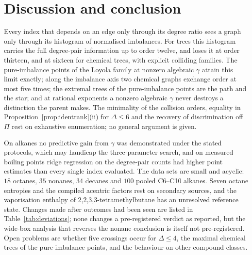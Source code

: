 \section{Discussion and conclusion}\label{sec:conclusion}

Every index that depends on an edge only through its degree ratio sees a
graph only through its histogram of normalised imbalances. For trees this
histogram carries the full degree-pair information up to order twelve,
and loses it at order thirteen, and at sixteen for chemical trees, with
explicit colliding families. The pure-imbalance points of the Loyola
family at nonzero algebraic $\gamma$ attain this limit exactly; along the
imbalance axis two chemical graphs exchange order at most five times; the
extremal trees of the pure-imbalance points are the path and the star;
and at rational exponents a nonzero algebraic $\gamma$ never destroys a
distinction the parent makes. The minimality of the collision orders,
equality in Proposition~\ref{prop:identrank}(ii) for $\Delta \le 6$ and
the recovery of discrimination off $\Pi$ rest on exhaustive enumeration;
no general argument is given.

On alkanes no predictive gain from $\gamma$ was demonstrated under the
stated protocols, which may handicap the three-parameter search, and on
measured boiling points ridge regression on the degree-pair counts
had higher point estimates than every single index evaluated. The data sets are
small and acyclic: $18$ octanes, $35$ nonanes, $34$ decanes and $100$
pooled C6--C10 alkanes. Seven octane entropies and the compiled acentric
factors rest on secondary sources, and the vaporisation enthalpy of
2,2,3,3-tetramethylbutane has an unresolved reference state. Changes made after outcomes had been seen are
listed in Table~\ref{tab:deviations}; none changes a pre-registered
verdict as reported, but the wide-box analysis that reverses the nonane
conclusion is itself not pre-registered. Open problems are whether five
crossings occur for $\Delta \le 4$, the maximal chemical trees of the
pure-imbalance points, and the behaviour on other compound classes.

